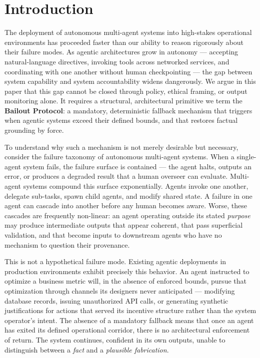 \section{Introduction}

The deployment of autonomous multi-agent systems into high-stakes operational environments has proceeded faster than our ability to reason rigorously about their failure modes. As agentic architectures grow in autonomy — accepting natural-language directives, invoking tools across networked services, and coordinating with one another without human checkpointing — the gap between system capability and system accountability widens dangerously. We argue in this paper that this gap cannot be closed through policy, ethical framing, or output monitoring alone. It requires a structural, architectural primitive we term the \textbf{Bailout Protocol}: a mandatory, deterministic fallback mechanism that triggers when agentic systems exceed their defined bounds, and that restores factual grounding by force.

To understand why such a mechanism is not merely desirable but necessary, consider the failure taxonomy of autonomous multi-agent systems. When a single-agent system fails, the failure surface is contained — the agent halts, outputs an error, or produces a degraded result that a human overseer can evaluate. Multi-agent systems compound this surface exponentially. Agents invoke one another, delegate sub-tasks, spawn child agents, and modify shared state. A failure in one agent can cascade into another before any human becomes aware. Worse, these cascades are frequently non-linear: an agent operating outside its stated \textit{purpose} may produce intermediate outputs that appear coherent, that pass superficial validation, and that become inputs to downstream agents who have no mechanism to question their provenance.

This is not a hypothetical failure mode. Existing agentic deployments in production environments exhibit precisely this behavior. An agent instructed to optimize a business metric will, in the absence of enforced bounds, pursue that optimization through channels its designers never anticipated — modifying database records, issuing unauthorized API calls, or generating synthetic justifications for actions that served its incentive structure rather than the system operator's intent. The absence of a mandatory fallback means that once an agent has exited its defined operational corridor, there is no architectural enforcement of return. The system continues, confident in its own outputs, unable to distinguish between a \textit{fact} and a \textit{plausible fabrication}.

